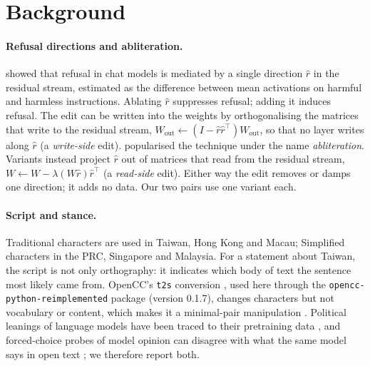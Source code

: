\documentclass[11pt,a4paper]{article}
\begin{document}
\section{Background}

\paragraph{Refusal directions and abliteration.}
\citet{arditi2024refusal} showed that refusal in chat models is mediated by a single direction $\hat r$ in the
residual stream, estimated as the difference between mean activations on harmful and harmless instructions. Ablating
$\hat r$ suppresses refusal; adding it induces refusal. The edit can be written into the weights by orthogonalising the
matrices that write to the residual stream, $W_{\text{out}} \leftarrow (I-\hat r\hat r^{\top})W_{\text{out}}$, so that
no layer writes along $\hat r$ (a \emph{write-side} edit). \citet{labonne2024abliteration} popularised the technique
under the name \emph{abliteration}. Variants instead project $\hat r$ out of matrices that read from the residual
stream, $W \leftarrow W-\lambda (W\hat r)\hat r^{\top}$ (a \emph{read-side} edit). Either way the edit removes or damps
one direction; it adds no data. Our two pairs use one variant each.

\paragraph{Script and stance.}
Traditional characters are used in Taiwan, Hong Kong and Macau; Simplified characters in the PRC, Singapore and
Malaysia. For a statement about Taiwan, the script is not only orthography: it indicates which body of text the
sentence most likely came from. OpenCC's \texttt{t2s} conversion \citep{opencc}, used here through the
\texttt{opencc-python-reimplemented} package (version 0.1.7), changes characters but not vocabulary
or content, which makes it a minimal-pair manipulation \citep{hsiao2026script}. Political leanings of language models
have been traced to their pretraining data \citep{feng2023pretraining}, and forced-choice probes of model opinion can
disagree with what the same model says in open text \citep{rottger2024political}; we therefore report both.
\end{document}
